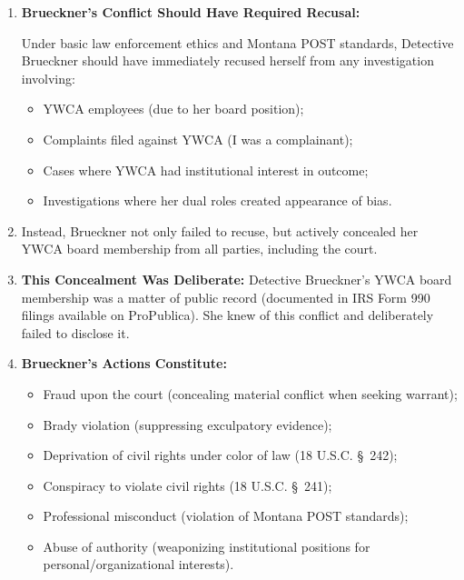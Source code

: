 \documentclass[12pt,letterpaper]{article}
\begin{document}
\begin{enumerate}
\begin{enumerate}
\item \textbf{Prevented Internal YWCA Accountability:} My June 3, 2018 complaint requested YWCA investigate E'Lise's conduct. Brueckner's criminal investigation of me effectively shut down any possibility of internal YWCA accountability by framing me as the criminal rather than the complainant.
\end{enumerate}

\item \textbf{Brueckner's Conflict Should Have Required Recusal:}

Under basic law enforcement ethics and Montana POST standards, Detective Brueckner should have immediately recused herself from any investigation involving:

\begin{itemize}
\item YWCA employees (due to her board position);
\item Complaints filed against YWCA (I was a complainant);
\item Cases where YWCA had institutional interest in outcome;
\item Investigations where her dual roles created appearance of bias.
\end{itemize}

\item Instead, Brueckner not only failed to recuse, but actively concealed her YWCA board membership from all parties, including the court.

\item \textbf{This Concealment Was Deliberate:} Detective Brueckner's YWCA board membership was a matter of public record (documented in IRS Form 990 filings available on ProPublica). She knew of this conflict and deliberately failed to disclose it.

\item \textbf{Brueckner's Actions Constitute:}

\begin{itemize}
\item Fraud upon the court (concealing material conflict when seeking warrant);
\item Brady violation (suppressing exculpatory evidence);
\item Deprivation of civil rights under color of law (18 U.S.C. \S~242);
\item Conspiracy to violate civil rights (18 U.S.C. \S~241);
\item Professional misconduct (violation of Montana POST standards);
\item Abuse of authority (weaponizing institutional positions for personal/organizational interests).
\end{itemize}


\end{enumerate}
\end{document}
